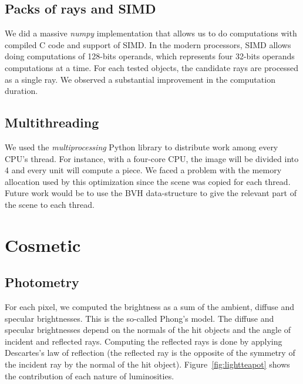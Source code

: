 \documentclass[acmsmall]{acmart}
\begin{document}
\subsection*{Packs of rays and SIMD}
We did a massive \textit{numpy} implementation that allows us to do computations with compiled C code and support of SIMD. In the modern processors, SIMD allows doing computations of 128-bits operands,
which represents four 32-bits operands computations at a time.
For each tested objects, the candidate rays are processed as a single ray.
We observed a substantial improvement in the computation duration.
\subsection*{Multithreading}
We used the \emph{multiprocessing} Python library to distribute work among every CPU's thread. For instance, with a four-core CPU, the image will be divided into 4 and every unit will compute a piece.
We faced a problem with the memory allocation used by this optimization since the scene was copied for each thread. Future work would be to use the BVH data-structure to give the relevant part of the scene to each thread. 

\section{Cosmetic}
\subsection*{Photometry}
For each pixel, we computed the brightness as a sum of the ambient, diffuse and specular brightnesses. This is the so-called Phong's model.
The diffuse and specular brightnesses depend on the normals of the hit objects and the angle of incident and reflected rays.
Computing the reflected rays is done by applying Descartes's law of reflection (the reflected ray is the opposite of the symmetry of the incident ray by the normal of the hit object). 
Figure~\ref{fig:lightteapot} shows the contribution of each nature of luminosities.
 
\end{document}
